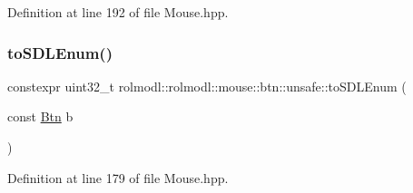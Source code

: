 Definition at line 192 of file Mouse.\+hpp.

\mbox{\label{namespacerolmodl_1_1rolmodl_1_1mouse_1_1btn_1_1unsafe_a76b354074768617e9cdcb51508820b8d}} 
\subsubsection{\texorpdfstring{toSDLEnum()}{toSDLEnum()}}
{\footnotesize\ttfamily constexpr uint32\+\_\+t rolmodl\+::rolmodl\+::mouse\+::btn\+::unsafe\+::to\+S\+D\+L\+Enum (\begin{DoxyParamCaption}\item[{const \mbox{\hyperlink{namespacerolmodl_1_1rolmodl_1_1mouse_a5ed523191c7ec81f6e69f02b9a616ebf}{Btn}}}]{b }\end{DoxyParamCaption})\hspace{0.3cm}{\ttfamily [noexcept]}}



Definition at line 179 of file Mouse.\+hpp.

